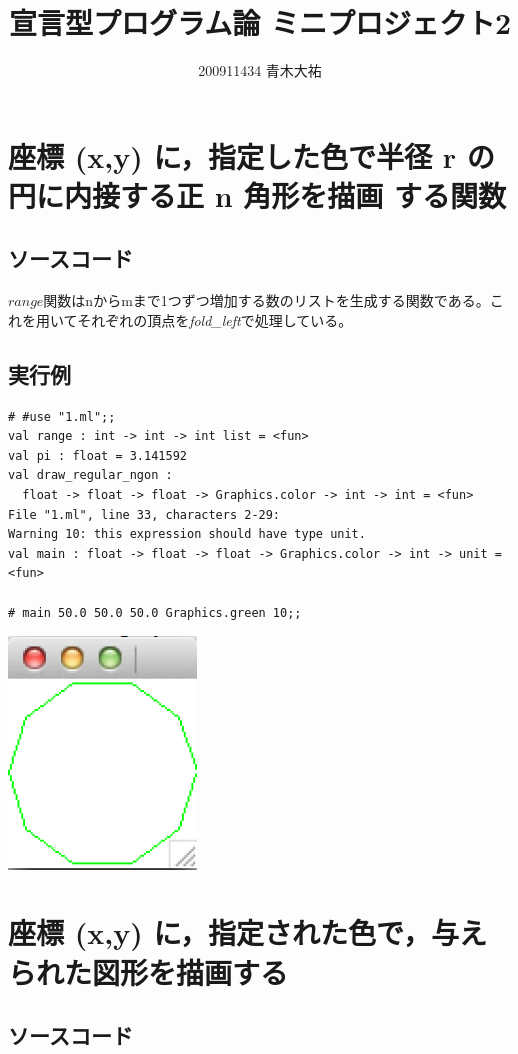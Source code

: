 \documentclass[a4paper,9pt]{jsarticle}
\title{宣言型プログラム論 ミニプロジェクト2}
\author{200911434 青木大祐}
\begin{document}
\maketitle
\newpage

\section{座標 (x,y) に，指定した色で半径 r の円に内接する正 n 角形を描画
 する関数}
\subsection{ソースコード}


$range$関数はnからmまで1つずつ増加する数のリストを生成する関数である。こ
れを用いてそれぞれの頂点を{\it{fold\_left}}で処理している。

\subsection{実行例}
\begin{lstlisting}
# #use "1.ml";;
val range : int -> int -> int list = <fun>
val pi : float = 3.141592
val draw_regular_ngon :
  float -> float -> float -> Graphics.color -> int -> int = <fun>
File "1.ml", line 33, characters 2-29:
Warning 10: this expression should have type unit.
val main : float -> float -> float -> Graphics.color -> int -> unit = <fun>

# main 50.0 50.0 50.0 Graphics.green 10;;
\end{lstlisting}
\includegraphics[width=5cm]{1_1.png} 



\section{座標 (x,y) に，指定された色で，与えられた図形を描画する}
\subsection{ソースコード}

\end{document}
